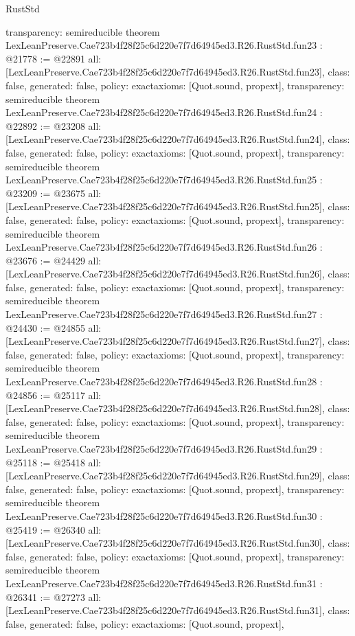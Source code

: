\begin{lexlean}{RustStd}
\begin{coremodule}
{  transparency: semireducible
}
theorem LexLeanPreserve.Cae723b4f28f25c6d220e7f7d64945ed3.R26.RustStd.fun23 : @21778 := @22891 {
  all: [LexLeanPreserve.Cae723b4f28f25c6d220e7f7d64945ed3.R26.RustStd.fun23],
  class: false,
  generated: false,
  policy: exact{axioms: [Quot.sound, propext]},
  transparency: semireducible
}
theorem LexLeanPreserve.Cae723b4f28f25c6d220e7f7d64945ed3.R26.RustStd.fun24 : @22892 := @23208 {
  all: [LexLeanPreserve.Cae723b4f28f25c6d220e7f7d64945ed3.R26.RustStd.fun24],
  class: false,
  generated: false,
  policy: exact{axioms: [Quot.sound, propext]},
  transparency: semireducible
}
theorem LexLeanPreserve.Cae723b4f28f25c6d220e7f7d64945ed3.R26.RustStd.fun25 : @23209 := @23675 {
  all: [LexLeanPreserve.Cae723b4f28f25c6d220e7f7d64945ed3.R26.RustStd.fun25],
  class: false,
  generated: false,
  policy: exact{axioms: [Quot.sound, propext]},
  transparency: semireducible
}
theorem LexLeanPreserve.Cae723b4f28f25c6d220e7f7d64945ed3.R26.RustStd.fun26 : @23676 := @24429 {
  all: [LexLeanPreserve.Cae723b4f28f25c6d220e7f7d64945ed3.R26.RustStd.fun26],
  class: false,
  generated: false,
  policy: exact{axioms: [Quot.sound, propext]},
  transparency: semireducible
}
theorem LexLeanPreserve.Cae723b4f28f25c6d220e7f7d64945ed3.R26.RustStd.fun27 : @24430 := @24855 {
  all: [LexLeanPreserve.Cae723b4f28f25c6d220e7f7d64945ed3.R26.RustStd.fun27],
  class: false,
  generated: false,
  policy: exact{axioms: [Quot.sound, propext]},
  transparency: semireducible
}
theorem LexLeanPreserve.Cae723b4f28f25c6d220e7f7d64945ed3.R26.RustStd.fun28 : @24856 := @25117 {
  all: [LexLeanPreserve.Cae723b4f28f25c6d220e7f7d64945ed3.R26.RustStd.fun28],
  class: false,
  generated: false,
  policy: exact{axioms: [Quot.sound, propext]},
  transparency: semireducible
}
theorem LexLeanPreserve.Cae723b4f28f25c6d220e7f7d64945ed3.R26.RustStd.fun29 : @25118 := @25418 {
  all: [LexLeanPreserve.Cae723b4f28f25c6d220e7f7d64945ed3.R26.RustStd.fun29],
  class: false,
  generated: false,
  policy: exact{axioms: [Quot.sound, propext]},
  transparency: semireducible
}
theorem LexLeanPreserve.Cae723b4f28f25c6d220e7f7d64945ed3.R26.RustStd.fun30 : @25419 := @26340 {
  all: [LexLeanPreserve.Cae723b4f28f25c6d220e7f7d64945ed3.R26.RustStd.fun30],
  class: false,
  generated: false,
  policy: exact{axioms: [Quot.sound, propext]},
  transparency: semireducible
}
theorem LexLeanPreserve.Cae723b4f28f25c6d220e7f7d64945ed3.R26.RustStd.fun31 : @26341 := @27273 {
  all: [LexLeanPreserve.Cae723b4f28f25c6d220e7f7d64945ed3.R26.RustStd.fun31],
  class: false,
  generated: false,
  policy: exact{axioms: [Quot.sound, propext]},
}
\end{coremodule}
\end{lexlean}
